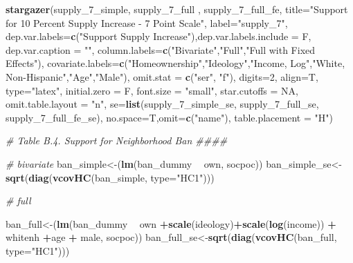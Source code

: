 \documentclass[]{article}
\newenvironment{Shaded}{\begin{snugshade}}{\end{snugshade}}
\newcommand{\CommentTok}[1]{\textcolor[rgb]{0.56,0.35,0.01}{\textit{#1}}}
\newcommand{\DataTypeTok}[1]{\textcolor[rgb]{0.13,0.29,0.53}{#1}}
\newcommand{\DecValTok}[1]{\textcolor[rgb]{0.00,0.00,0.81}{#1}}
\newcommand{\KeywordTok}[1]{\textcolor[rgb]{0.13,0.29,0.53}{\textbf{#1}}}
\newcommand{\NormalTok}[1]{#1}
\newcommand{\OperatorTok}[1]{\textcolor[rgb]{0.81,0.36,0.00}{\textbf{#1}}}
\newcommand{\OtherTok}[1]{\textcolor[rgb]{0.56,0.35,0.01}{#1}}
\newcommand{\StringTok}[1]{\textcolor[rgb]{0.31,0.60,0.02}{#1}}
\begin{document}
\begin{Shaded}
\begin{Highlighting}[]
{{{\KeywordTok{stargazer}\NormalTok{(supply_}\DecValTok{7}\NormalTok{_simple,  supply_}\DecValTok{7}\NormalTok{_full , supply_}\DecValTok{7}\NormalTok{_full_fe, }\DataTypeTok{title=}\StringTok{"Support for 10 Percent Supply Increase - 7 Point Scale"}\NormalTok{, }\DataTypeTok{label=}\StringTok{"supply_7"}\NormalTok{,}
          \DataTypeTok{dep.var.labels=}\KeywordTok{c}\NormalTok{(}\StringTok{"Support Supply Increase"}\NormalTok{),}\DataTypeTok{dep.var.labels.include =}\NormalTok{ F, }\DataTypeTok{dep.var.caption =} \StringTok{""}\NormalTok{,}
          \DataTypeTok{column.labels=}\KeywordTok{c}\NormalTok{(}\StringTok{"Bivariate"}\NormalTok{,}\StringTok{"Full"}\NormalTok{,}\StringTok{"Full with Fixed Effects"}\NormalTok{),}
          \DataTypeTok{covariate.labels=}\KeywordTok{c}\NormalTok{(}\StringTok{"Homeownership"}\NormalTok{,}\StringTok{"Ideology"}\NormalTok{,}\StringTok{"Income, Log"}\NormalTok{,}\StringTok{"White, Non-Hispanic"}\NormalTok{,}\StringTok{"Age"}\NormalTok{,}\StringTok{"Male"}\NormalTok{),}
          \DataTypeTok{omit.stat =} \KeywordTok{c}\NormalTok{(}\StringTok{"ser"}\NormalTok{, }\StringTok{"f"}\NormalTok{), }\DataTypeTok{digits=}\DecValTok{2}\NormalTok{, }\DataTypeTok{align=}\NormalTok{T, }\DataTypeTok{type=}\StringTok{"latex"}\NormalTok{,}
          \DataTypeTok{initial.zero =}\NormalTok{ F,  }\DataTypeTok{font.size =} \StringTok{"small"}\NormalTok{, }\DataTypeTok{star.cutoffs =} \OtherTok{NA}\NormalTok{, }\DataTypeTok{omit.table.layout =} \StringTok{"n"}\NormalTok{,}
          \DataTypeTok{se=}\KeywordTok{list}\NormalTok{(supply_}\DecValTok{7}\NormalTok{_simple_se, supply_}\DecValTok{7}\NormalTok{_full_se, supply_}\DecValTok{7}\NormalTok{_full_fe_se), }\DataTypeTok{no.space=}\NormalTok{T,}\DataTypeTok{omit=}\KeywordTok{c}\NormalTok{(}\StringTok{"name"}\NormalTok{), }\DataTypeTok{table.placement =} \StringTok{"H"}\NormalTok{)}


\CommentTok{# Table B.4. Support for Neighborhood Ban ####}

\CommentTok{# bivariate}
\NormalTok{ban_simple<-(}\KeywordTok{lm}\NormalTok{(ban_dummy }\OperatorTok{~}\StringTok{ }\NormalTok{own, socpoc))}
\NormalTok{ban_simple_se<-}\KeywordTok{sqrt}\NormalTok{(}\KeywordTok{diag}\NormalTok{(}\KeywordTok{vcovHC}\NormalTok{(ban_simple, }\DataTypeTok{type=}\StringTok{"HC1"}\NormalTok{)))}

\CommentTok{# full}

\NormalTok{ban_full<-(}\KeywordTok{lm}\NormalTok{(ban_dummy }\OperatorTok{~}\StringTok{ }\NormalTok{own }\OperatorTok{+}\KeywordTok{scale}\NormalTok{(ideology)}\OperatorTok{+}\KeywordTok{scale}\NormalTok{(}\KeywordTok{log}\NormalTok{(income)) }\OperatorTok{+}\StringTok{ }\NormalTok{whitenh  }\OperatorTok{+}\NormalTok{age }\OperatorTok{+}\StringTok{ }\NormalTok{male, socpoc))}
\NormalTok{ban_full_se<-}\KeywordTok{sqrt}\NormalTok{(}\KeywordTok{diag}\NormalTok{(}\KeywordTok{vcovHC}\NormalTok{(ban_full, }\DataTypeTok{type=}\StringTok{"HC1"}\NormalTok{)))}

}}}
\end{Highlighting}
\end{Shaded}
\end{document}
